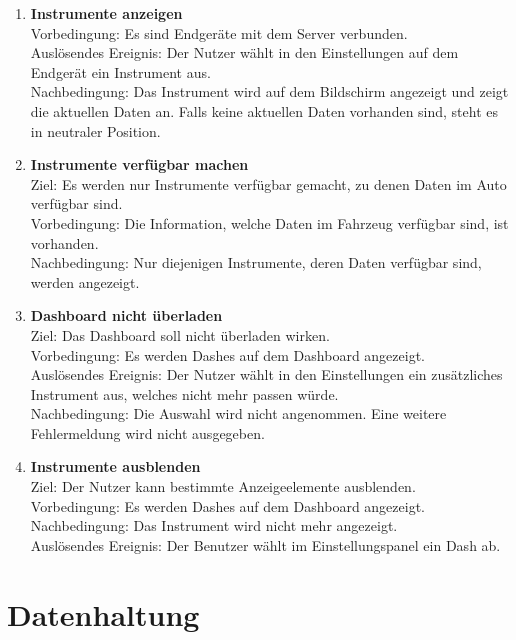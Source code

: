 \documentclass[pflichtenheft.tex]{subfiles}
\begin{document}
	\begin{enumerate}
	\setcounter{enumi}{\value{enumTemp}}
		\item{\textbf{Instrumente anzeigen}} \\Vorbedingung: Es sind Endgeräte mit dem Server verbunden.\\ Auslösendes Ereignis: Der Nutzer wählt in den Einstellungen auf dem Endgerät ein Instrument aus.\\ Nachbedingung: Das Instrument wird auf dem Bildschirm angezeigt und zeigt die aktuellen Daten an. Falls keine aktuellen Daten vorhanden sind, steht es in neutraler Position.
		\item{\textbf{Instrumente verfügbar machen}} \\
		Ziel: Es werden nur Instrumente verfügbar gemacht, zu denen Daten im Auto verfügbar sind. \\
		Vorbedingung: Die Information, welche Daten im Fahrzeug verfügbar sind, ist vorhanden. \\
		Nachbedingung: Nur diejenigen Instrumente, deren Daten verfügbar sind, werden angezeigt. \\
		\item{\textbf{Dashboard nicht überladen}} \\Ziel: Das Dashboard soll nicht überladen wirken.\\
		Vorbedingung: Es werden Dashes auf dem Dashboard angezeigt. \\Auslösendes Ereignis: Der Nutzer wählt in den Einstellungen ein zusätzliches Instrument aus, welches nicht mehr passen würde.\\
		Nachbedingung: Die Auswahl wird nicht angenommen. Eine weitere Fehlermeldung wird nicht ausgegeben.
		\item{\textbf{Instrumente ausblenden}} \\
		Ziel: Der Nutzer kann bestimmte Anzeigeelemente ausblenden.\\
		Vorbedingung: Es werden Dashes auf dem Dashboard angezeigt.\\
		Nachbedingung: Das Instrument wird nicht mehr angezeigt.\\
		Auslösendes Ereignis: Der Benutzer wählt im Einstellungspanel ein Dash ab.
		\setcounter{enumTemp}{\value{enumi}}
	\end{enumerate} 
	
	\section{Datenhaltung}
\end{document}
